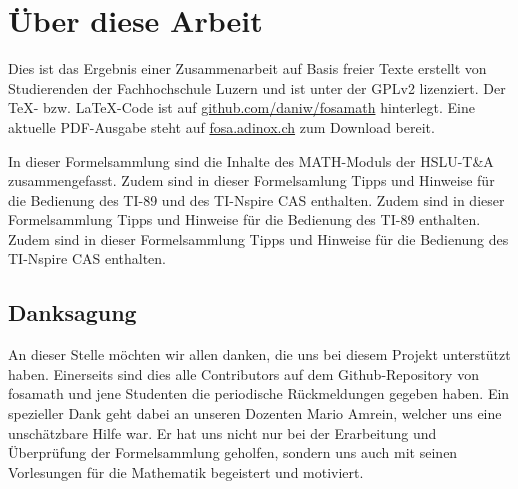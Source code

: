



\chapter*{Über diese Arbeit}
Dies ist das Ergebnis einer Zusammenarbeit auf Basis freier Texte erstellt von Studierenden der Fachhochschule Luzern und ist unter der GPLv2 lizenziert. Der \TeX - bzw. \LaTeX -Code ist auf \url{github.com/daniw/fosamath} hinterlegt. Eine aktuelle PDF-Ausgabe steht auf \url{fosa.adinox.ch} zum Download bereit.

In dieser Formelsammlung sind die Inhalte des MATH-Moduls der HSLU-T\&A zusammengefasst.
%
\iftiboth
	Zudem sind in dieser Formelsamlung Tipps und Hinweise für die Bedienung des TI-89 und des TI-Nspire CAS enthalten. 
	\else
	\ifti
		Zudem sind in dieser Formelsammlung Tipps und Hinweise für die Bedienung des TI-89 enthalten. 
	\fi
	\ifnspire
		Zudem sind in dieser Formelsammlung Tipps und Hinweise für die Bedienung des TI-Nspire CAS enthalten. 
	\fi
\fi




\section*{Danksagung}
An dieser Stelle möchten wir allen danken, die uns bei diesem Projekt unterstützt haben.
Einerseits sind dies alle Contributors auf dem Github-Repository von fosamath und jene Studenten die
periodische Rückmeldungen gegeben haben.
Ein spezieller Dank geht dabei an unseren Dozenten Mario Amrein, welcher uns eine unschätzbare Hilfe war.
Er hat uns nicht nur bei der Erarbeitung und Überprüfung der Formelsammlung geholfen, sondern uns auch 
mit seinen Vorlesungen für die Mathematik begeistert und motiviert.
